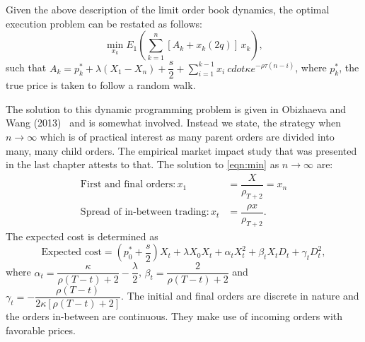 Given the above description of the limit order book dynamics, the optimal execution problem can be restated as follows:
	\begin{equation} \label{eqn:min}
	\min_{x_k} E_1\left( \sum_{k=1}^n [A_k + x_k(2q)] \,x_k \right),
	\end{equation}
such that $A_k= p_k^* + \lambda(X_1-X_n) + \dfrac{s}{2} + \sum_{i=1}^{k-1} x_i\ cdot \kappa e^{- \rho \tau(n-i)}$, where $p_k^*$, the true price is taken to follow a random walk.


The solution to this dynamic programming problem is given in Obizhaeva and Wang (2013)~\cite[p.14, Proposition 1]{obizhaeva} and is somewhat involved. Instead we state, the strategy when $n \to \infty$ which is of practical interest as many parent orders are divided into many, many child orders. The empirical market impact study that was presented in the last chapter attests to that. The solution to \eqref{eqn:min} as $n \to \infty$ are:
	\begin{equation} \label{eqn:orders}
	\begin{split}
	\text{First and final orders}: x_1&= \dfrac{X}{\rho_{T+2}} = x_n  \\
	\text{Spread of in-between trading}: x_t&= \dfrac{\rho x}{\rho_{T+2}}.
	\end{split}
	\end{equation}
The expected cost is determined as
	\begin{equation} \label{eqn:expected}
	\text{Expected cost}= \left( p_0^* + \dfrac{s}{2} \right) X_t + \lambda X_0 X_t + \alpha_t X_t^2 + \beta_t X_t D_t + \gamma_t D_t^2,
	\end{equation}
where $\alpha_t= \dfrac{\kappa}{\rho(T-t)+2} - \dfrac{\lambda}{2}$, $\beta_t= \dfrac{2}{\rho(T-t) + 2}$ and $\gamma_t= - \dfrac{\rho(T-t)}{2 \kappa[\rho(T-t) + 2]}$. The initial and final orders are discrete in nature and the orders in-between are continuous. They make use of incoming orders with favorable prices. 


